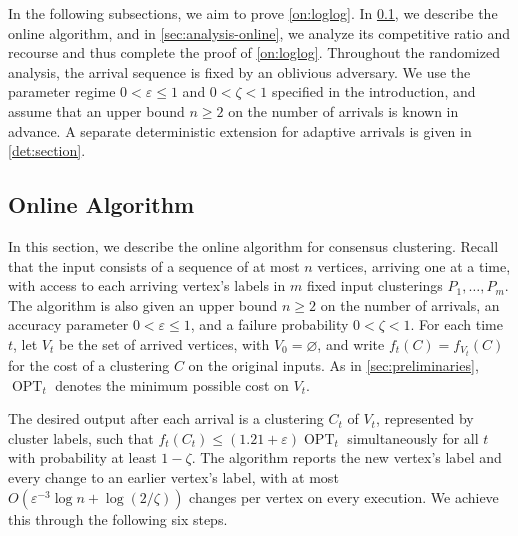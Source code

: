 \documentclass[11pt]{article}
\newcommand{\OPT}{\operatorname{OPT}}
\begin{document}
In the following subsections, we aim to prove \cref{on:loglog}.
In \cref{sec:algorithms-online}, we describe the online algorithm, and
in \cref{sec:analysis-online}, we analyze its competitive ratio and
recourse and thus complete the proof of \cref{on:loglog}.
Throughout the randomized analysis, the arrival sequence is fixed by
an oblivious adversary. We use the parameter regime
$0<\varepsilon\le1$ and $0<\zeta<1$ specified in the introduction,
and assume that an upper bound $n\ge2$ on the number of arrivals is
known in advance. A separate deterministic extension for adaptive
arrivals is given in \cref{det:section}.

\subsection{Online Algorithm}
\label{sec:algorithms-online}

In this section, we describe the online algorithm for consensus clustering.
Recall that the input consists of a sequence of at most $n$ vertices,
arriving one at a time, with access to each arriving vertex's labels in
$m$ fixed input clusterings $P_1,\ldots,P_m$. The algorithm is also
given an upper bound $n\ge2$ on the number of arrivals, an accuracy
parameter $0<\varepsilon\le1$, and a failure probability $0<\zeta<1$.
For each time $t$, let $V_t$ be the set of arrived vertices, with
$V_0=\varnothing$, and write $f_t(C)=f_{V_t}(C)$ for the cost of a
clustering $C$ on the original inputs. As in \cref{sec:preliminaries},
$\OPT_t$ denotes the minimum possible cost on $V_t$.

The desired output after each arrival is a clustering $C_t$ of $V_t$,
represented by cluster labels, such that
$f_t(C_t)\le(1.21+\varepsilon)\OPT_t$ simultaneously for all $t$
with probability at least $1-\zeta$. The algorithm reports the new
vertex's label and every change to an earlier vertex's label, with at
most $O(\varepsilon^{-3}\log n+\log(2/\zeta))$ changes per vertex
on every execution. We achieve this through the following six steps.
\end{document}
